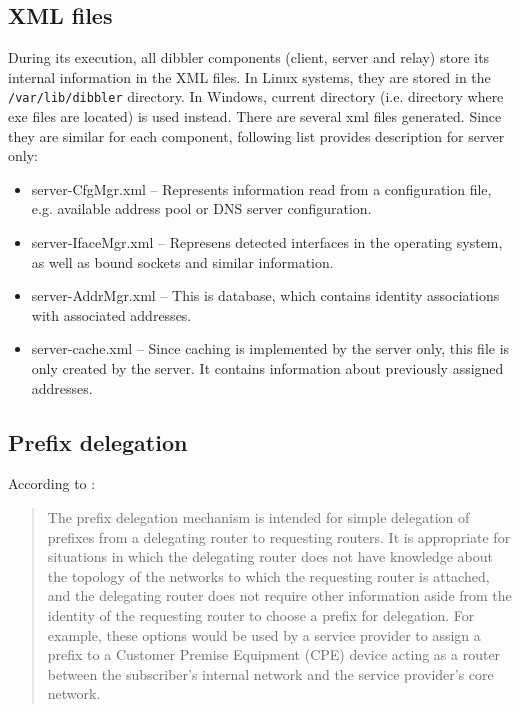 \subsection{XML files}
\label{features-xml}
During its execution, all dibbler components (client, server and
relay) store its internal information in the XML files. In Linux
systems, they are stored in the \verb+/var/lib/dibbler+ directory. In
Windows, current directory (i.e. directory where exe files are
located) is used instead. There are several xml files generated. Since
they are similar for each component, following list provides
description for server only:

\begin{itemize}
\item server-CfgMgr.xml -- Represents information read from a
  configuration file, e.g. available address pool or DNS server
      configuration.
\item server-IfaceMgr.xml -- Represens detected interfaces in the
  operating system, as well as bound sockets and similar information.
\item server-AddrMgr.xml -- This is database, which contains identity
  associations with associated addresses.
 \item server-cache.xml -- Since caching is implemented by the server
      only, this file is only created by the server. It contains
      information about previously assigned addresses. 
\end{itemize}

\subsection{Prefix delegation}
\label{features-prefix}
According to \cite{rfc3633}: 

\begin{quote}
   The prefix delegation mechanism is
   intended for simple delegation of prefixes from a delegating router
   to requesting routers.  It is appropriate for situations in which the
   delegating router does not have knowledge about the topology of the
   networks to which the requesting router is attached, and the
   delegating router does not require other information aside from the
   identity of the requesting router to choose a prefix for delegation.
   For example, these options would be used by a service provider to
   assign a prefix to a Customer Premise Equipment (CPE) device acting
   as a router between the subscriber's internal network and the service
   provider's core network.
\end{quote}


